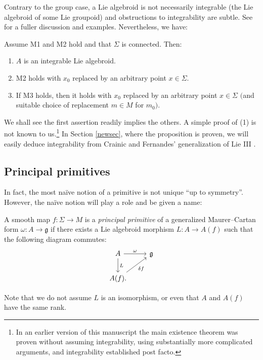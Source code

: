 Contrary to the group case, a Lie algebroid is not necessarily
integrable (the Lie algebroid of some Lie groupoid) and obstructions
to integrability are subtle. See \cite{Crainic_Fernandes_11} for a
fuller discussion and examples. Nevertheless, we have:
\begin{Proposition}\label{frogP}
Assume {\normalfont M1} and {\normalfont M2} hold
and that $\Sigma$ is connected. Then:
 \begin{enumerate}\itemsep=0pt
 \item[$1.$] $A$ is an integrable Lie algebroid.%
 \item[$2.$] {\normalfont M2} holds with $x_0$ replaced by an arbitrary
point $x \in \Sigma $.%
 \item[$3.$] If {\normalfont M3} holds, then it holds with $x_0$
replaced by an arbitrary point $x \in \Sigma $ $($and suitable choice of
replacement $m \in M$ for $m_0)$.%
 \end{enumerate}
\end{Proposition}
%
We shall see the first assertion readily implies the others. A simple
proof of (1) is not known to us.\footnote{In an earlier
 version of this manuscript the main existence theorem was proven
 without assuming integrability, using substantially more complicated
 arguments, and integrability established post facto.} In Section
\ref{newsec}, where the proposition is proven, we will easily deduce
integrability from Crainic and Fernandes' generalization of Lie III
\cite{Crainic_Fernandes_03}.

\subsection*{Principal primitives}

In fact, the most na\"ive notion of a primitive is not unique ``up to
symmetry''. However, the na\"ive notion will play a role and be given a
name:
\begin{Definition}
 A smooth map $f \colon \Sigma \rightarrow M$ is a {\it principal
 primitive} of a generalized Maurer--Cartan form
 $\omega \colon A \rightarrow {\mathfrak g} $ if there exists a Lie
 algebroid morphism $L \colon A \rightarrow A(f)$ such that the
 following diagram commutes:
 \begin{equation}
 \begin{tikzcd} A \arrow{d}{L} \arrow{r}{\omega } & {\mathfrak g}
 \\ A(f). \arrow[swap]{ru}{\delta f} &
 \end{tikzcd}
 \label{carpet:court}
 \end{equation}
\end{Definition}
 Note that we do not assume $L $ is an isomorphism, or even
that $A$ and $A(f)$ have the same rank.

